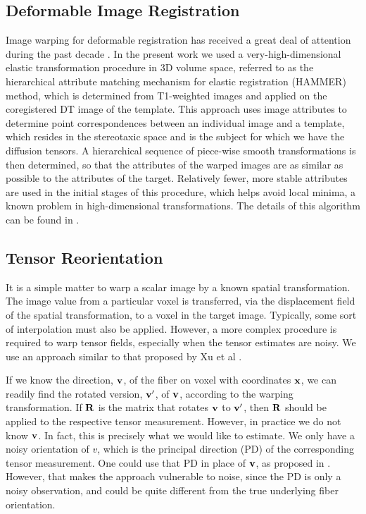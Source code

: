 \subsection{Deformable Image Registration}

Image warping for deformable registration has received a great deal of attention during the past decade \cite{Zitova03}. In the present work we used a very-high-dimensional elastic transformation procedure in 3D volume space, referred to as the hierarchical attribute matching mechanism for elastic registration (HAMMER) method, which is determined from T1-weighted images and applied on the coregistered DT image of the template. This approach uses image attributes to determine point correspondences between an individual image and a template, which resides in the stereotaxic space and is the subject for which we have the diffusion tensors. A hierarchical sequence of piece-wise smooth transformations is then determined, so that the attributes of the warped images are as similar as possible to the attributes of the target. Relatively fewer, more stable attributes are used in the initial stages of this procedure, which helps avoid local minima, a known problem in high-dimensional transformations. The details of this algorithm can be found in \cite{hammer}.


\subsection{Tensor Reorientation}
It is a simple matter to warp a scalar image by a known spatial transformation. The image value from a particular voxel is transferred, via the displacement field of the spatial transformation, to a voxel in the target image. Typically, some sort of interpolation must also be applied. However, a more complex procedure is required to warp tensor fields, especially when the tensor estimates are noisy. We use an approach similar to that proposed by Xu et al \cite{xu03}.

If we know the direction, ${\bf v}$, of the fiber on voxel with coordinates ${\bf x}$, we can readily find the rotated version, ${\bf v}'$, of ${\bf v}$, according to the warping transformation. If ${\bf R}$ is the matrix that rotates ${\bf v}$ to ${\bf v'}$, then ${\bf R}$ should be applied to the respective tensor measurement. However, in practice we do not know ${\bf v}$. In fact, this is precisely what we would like to estimate. We only have a noisy orientation of $v$, which is the principal direction (PD) of the corresponding tensor measurement. One could use that PD in place of ${\bf v}$, as proposed in \cite{alex01}. However, that makes the approach vulnerable to noise, since the PD is only a noisy observation, and could be quite different from the true underlying fiber orientation. 

